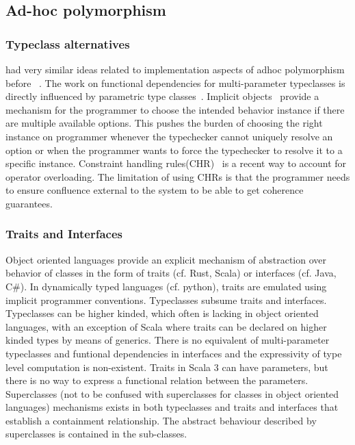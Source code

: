 \documentclass[screen,nonacm,manuscript,review]{acmart} %
\begin{document}
\subsection{Ad-hoc polymorphism}\label{sec:rw-adhoc-poly}
\subsubsection{Typeclass alternatives}
\citet{kaes_parametric_1988} had very similar ideas related to
implementation aspects of adhoc polymorphism before
~\citet{wadler_polymorphism_1989}. The work on functional dependencies
for multi-parameter typeclasses is directly influenced by parametric
type classes~\cite{chen_parametric_1992}. Implicit
objects~\cite{oliveira_typeclasses_2010} provide a mechanism for the
programmer to choose the intended behavior instance if
there are multiple available options. This pushes the burden of choosing the
right instance on programmer whenever the typechecker cannot uniquely
resolve an option or when the programmer wants to force the
typechecker to resolve it to a specific instance. Constraint handling
rules(CHR)~\cite{fruhwirth_theory_1998,stuckey_theory_2005} is a recent
way to account for operator overloading. The limitation of using CHRs
is that the programmer needs to ensure confluence external to the
system to be able to get coherence guarantees.

\subsubsection{Traits and Interfaces}
Object oriented languages provide an explicit mechanism of abstraction
over behavior of classes in the form of traits (cf. Rust, Scala) or
interfaces (cf. Java, C\#). In dynamically typed languages
(cf. python), traits are emulated using implicit programmer
conventions. Typeclasses subsume traits and interfaces. Typeclasses
can be higher kinded, which often is lacking in object oriented
languages, with an exception of Scala where traits can be declared on
higher kinded types by means of generics. There is no equivalent of
multi-parameter typeclasses and funtional dependencies in interfaces
and the expressivity of type level computation is non-existent. Traits
in Scala 3 can have parameters, but there is no way to express a
functional relation between the parameters. Superclasses (not to be
confused with superclasses for classes in object oriented languages)
mechanisms exists in both typeclasses and traits and interfaces that
establish a containment relationship. The abstract behaviour described
by superclasses is contained in the sub-classes.
\end{document}
